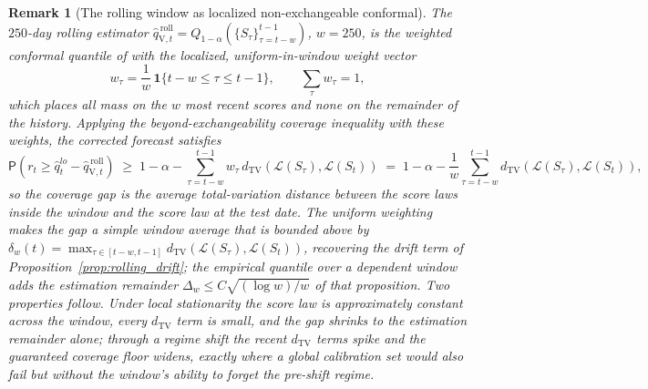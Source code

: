 \documentclass[11pt]{article}
\newtheorem{remark}[theorem]{Remark}
\renewcommand{\P}{\mathsf{P}}
\newcommand{\1}{\boldsymbol{1}}
\newcommand{\qVroll}{\hat{q}_{{\scriptscriptstyle\mathrm{V}},t}^{\,\mathrm{roll}}}
\newcommand{\dTV}{d_{\mathrm{TV}}}
\begin{document}
\begin{remark}[The rolling window as localized non-exchangeable conformal]
\label{rem:rolling}
The $250$-day rolling estimator
$\qVroll=Q_{1-\alpha}(\{S_\tau\}_{\tau=t-w}^{t-1})$, $w=250$, is the weighted
conformal quantile of \citet{barber2023conformal} with the localized,
uniform-in-window weight vector
\begin{equation}
\label{eq:rr_weights}
w_\tau = \frac{1}{w}\,\mathbf 1\{t-w\le \tau\le t-1\},
\qquad \sum_{\tau} w_\tau = 1,
\end{equation}
which places all mass on the $w$ most recent scores and none on the remainder
of the history. Applying the beyond-exchangeability coverage inequality with
these weights, the corrected forecast satisfies
\begin{equation}
\label{eq:rr_coverage_gap}
\P\!\left(r_t \ge \hat q_t^{lo}-\qVroll\right)
\;\ge\;
1-\alpha-\sum_{\tau=t-w}^{t-1} w_\tau\,
\dTV\!\left(\mathcal L(S_\tau),\mathcal L(S_t)\right)
\;=\;
1-\alpha-\frac{1}{w}\sum_{\tau=t-w}^{t-1}
\dTV\!\left(\mathcal L(S_\tau),\mathcal L(S_t)\right),
\end{equation}
so the coverage gap is the \emph{average} total-variation distance between the
score laws inside the window and the score law at the test date. The uniform
weighting makes the gap a simple window average that is bounded above by
$\delta_w(t)=\max_{\tau\in[t-w,t-1]}\dTV(\mathcal L(S_\tau),\mathcal L(S_t))$,
recovering the drift term of Proposition~\ref{prop:rolling_drift}; the empirical
quantile over a dependent window adds the estimation remainder
$\Delta_w\le C\sqrt{(\log w)/w}$ of that proposition. Two properties follow.
Under local stationarity the score law is approximately constant across the
window, every $\dTV$ term is small, and the gap shrinks to the estimation
remainder alone; through a regime shift the recent $\dTV$ terms spike and the
guaranteed coverage floor widens, exactly where a global calibration set would
also fail but without the window's ability to forget the pre-shift regime.
\end{remark}
\end{document}
